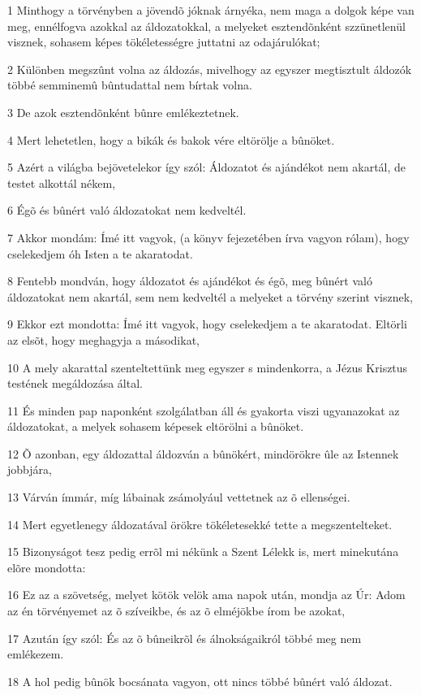 \par 1 Minthogy a törvényben a jövendõ jóknak árnyéka, nem maga a dolgok képe van meg, ennélfogva azokkal az áldozatokkal, a melyeket esztendõnként szzünetlenül visznek, sohasem képes tökéletességre juttatni az odajárulókat;
\par 2 Különben megszûnt volna az áldozás, mivelhogy az egyszer megtisztult áldozók többé semminemû bûntudattal nem bírtak volna.
\par 3 De azok esztendõnként bûnre emlékeztetnek.
\par 4 Mert lehetetlen, hogy a bikák és bakok vére eltörölje a bûnöket.
\par 5 Azért a világba bejövetelekor így szól: Áldozatot és ajándékot nem akartál, de testet alkottál nékem,
\par 6 Égõ és bûnért való áldozatokat nem kedveltél.
\par 7 Akkor mondám: Ímé itt vagyok, (a könyv fejezetében írva vagyon rólam), hogy cselekedjem óh Isten a te akaratodat.
\par 8 Fentebb mondván, hogy áldozatot és ajándékot és égõ, meg bûnért való áldozatokat nem akartál, sem nem kedveltél a melyeket a törvény szerint visznek,
\par 9 Ekkor ezt mondotta: Ímé itt vagyok, hogy cselekedjem a te akaratodat. Eltörli az elsõt, hogy meghagyja a másodikat,
\par 10 A mely akarattal szenteltettünk meg egyszer s mindenkorra, a Jézus Krisztus testének megáldozása által.
\par 11 És minden pap naponként szolgálatban áll és gyakorta viszi ugyanazokat az áldozatokat, a melyek sohasem képesek eltörölni a bûnöket.
\par 12 Õ azonban, egy áldozattal áldozván a bûnökért, mindörökre ûle az Istennek jobbjára,
\par 13 Várván ímmár, míg lábainak zsámolyául vettetnek az õ ellenségei.
\par 14 Mert egyetlenegy áldozatával örökre tökéletesekké tette a megszentelteket.
\par 15 Bizonyságot tesz pedig errõl mi nékünk a Szent Lélekk is, mert minekutána elõre mondotta:
\par 16 Ez az a szövetség, melyet kötök velök ama napok után, mondja az Úr: Adom az én törvényemet az õ szíveikbe, és az õ elméjökbe írom be azokat,
\par 17 Azután így szól: És az õ bûneikrõl és álnokságaikról többé meg nem emlékezem.
\par 18 A hol pedig bûnök bocsánata vagyon, ott nincs többé bûnért való áldozat.

